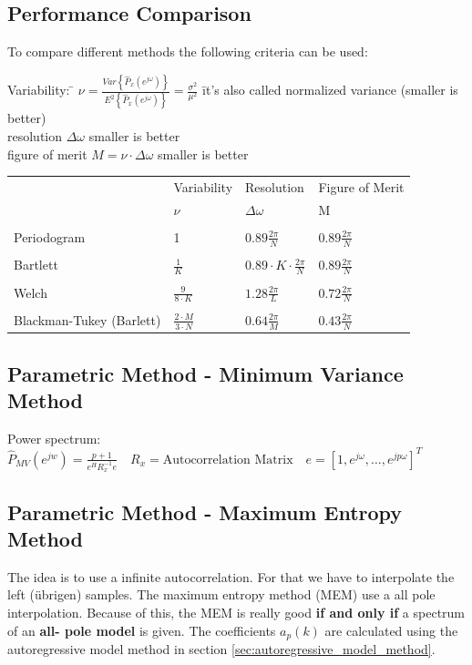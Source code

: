 \subsection{Performance Comparison }
To compare different methods the following criteria can be used:\\
\begin{tabbing}
Variability:   \hspace{1cm}  	\= 
  $\nu=\frac{Var\left\lbrace\hat{P}_{x}(e^{j\omega})\right\rbrace}{E^2\left\lbrace\hat{P}_{x}(e^{j\omega})\right\rbrace}=\frac{\sigma^2}{\mu^2}$ 
  \hspace{1cm} \= it's also called normalized variance (smaller is better)\\
  resolution \> $\Delta \omega$ \> smaller is better\\
  figure of merit					\> $M=\nu\cdot \Delta\omega$ \> smaller is better\\
\end{tabbing}
\begin{tabular}{p{3cm} | p{2cm} p{2.5cm} p{3cm}}
& Variability & Resolution & Figure of Merit\\
& $\nu$	&	$\Delta\omega$	& M \\
\hline\\
Periodogram & 1 & $0.89 \frac{2\pi}{N}$ & $0.89 \frac{2\pi}{N}$\\\\
Bartlett & $\frac{1}{K}$ & $0.89\cdot K \cdot  \frac{2\pi}{N}$ & $0.89 \frac{2\pi}{N}$\\\\
Welch & $\frac{9}{8\cdot K}$ & $1.28 \frac{2\pi}{L}$ & $0.72 \frac{2\pi}{N}$\\\\
Blackman-Tukey (Barlett)& $\frac{2\cdot M}{3\cdot N}$  & $0.64 \frac{2\pi}{M}$ & $0.43 \frac{2\pi}{N}$
\end{tabular}

\subsection{Parametric Method - Minimum Variance Method }
Power spectrum: $\hat{P}_{MV}(e^{jw}) = \frac{p+1}{e^H R_x^{-1}e} \quad R_x = \text{Autocorrelation Matrix} \quad e=[1,e^{j\omega},\ldots, e^{jp\omega}]^T$

\subsection{Parametric Method - Maximum Entropy Method }
The idea is to use a infinite autocorrelation. For that we have to interpolate the left (übrigen) samples. 
The maximum entropy method (MEM) use a all pole interpolation.
Because of this, the MEM is really good \textbf{if and only if} a spectrum of an \textbf{all- pole model} is given. The coefficients $a_p(k)$ are calculated using the autoregressive model method in section \ref{sec:autoregressive_model_method}.

